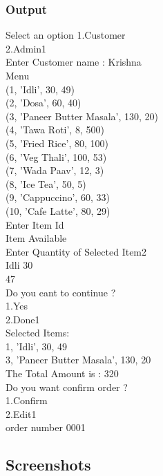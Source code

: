 \documentclass[12pt]{article}
\begin{document}
\subsubsection{Output}
Select an option 1.Customer\\
2.Admin1\\
Enter Customer name : Krishna\\
Menu\\
(1, 'Idli', 30, 49)\\
(2, 'Dosa', 60, 40)\\
(3, 'Paneer Butter Masala', 130, 20)\\
(4, 'Tawa Roti', 8, 500)\\
(5, 'Fried Rice', 80, 100)\\
(6, 'Veg Thali', 100, 53)\\
(7, 'Wada Paav', 12, 3)\\
(8, 'Ice Tea', 50, 5)\\
(9, 'Cappuccino', 60, 33)\\
(10, 'Cafe Latte', 80, 29)\\
Enter Item Id\\
Item Available\\
Enter Quantity of Selected Item2\\
Idli 30\\
47\\
Do you eant to continue ?\\
1.Yes\\
2.Done1\\
Selected Items:\\
1, 'Idli', 30, 49\\
3, 'Paneer Butter Masala', 130, 20\\
The Total Amount is : 320\\
Do you want confirm order ?\\
1.Confirm\\
2.Edit1\\
order number  0001\\
\subsection{Screenshots}
\end{document}
